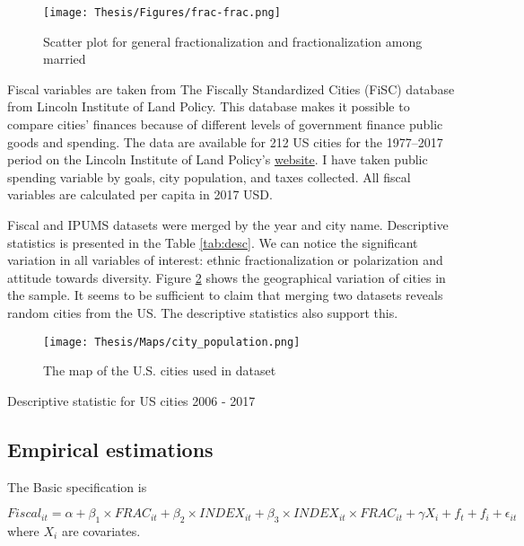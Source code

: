 \documentclass[12pt]{article}
\begin{document}
\begin{figure}[h!]
    \centering
    \texttt{[image: Thesis/Figures/frac-frac.png]}
    \caption{Scatter plot for general fractionalization and fractionalization among married}
    \label{fig:frac-frac}
\end{figure}

Fiscal variables are taken from The Fiscally Standardized Cities (FiSC) database from Lincoln Institute of Land Policy. This database makes it possible to compare cities' finances because of different levels of government finance public goods and spending. The data are available for 212 US cities for the 1977–2017 period on the Lincoln Institute of Land Policy's \hyperlink{https://www.lincolninst.edu/research-data/data-toolkits/fiscally-standardized-cities}{website}. I have taken public spending variable by goals, city population, and taxes collected. All fiscal variables are calculated per capita in 2017 USD.

Fiscal and IPUMS datasets were merged by the year and city name. Descriptive statistics is presented in the Table \ref{tab:desc}. We can notice the significant variation in all variables of interest: ethnic fractionalization or polarization and attitude towards diversity. Figure \ref{fig:map} shows the geographical variation of cities in the sample. It seems to be sufficient to claim that merging two datasets reveals random cities from the US. The descriptive statistics also support this. 

\begin{figure}[h!]
    \centering
    \texttt{[image: Thesis/Maps/city\_population.png]}
    \caption{The map of the U.S. cities used in dataset}
    \label{fig:map}
\end{figure}

\begin{table}[h!]
    \centering
    
    \caption{Descriptive statistic for US cities 2006 - 2017}
    \label{tab:desc}
\end{table}

\subsection{Empirical estimations}

The Basic specification is 

\begin{equation}
\label{eq: basic}
    Fiscal_{it} = \alpha + \beta_1 \times FRAC_{it} + \beta_2 \times INDEX_{it} + \beta_3 \times INDEX_{it} \times FRAC_{it} + \gamma X_i + f_t + f_i + \epsilon_{it}
\end{equation}
where $X_i$ are covariates.
\end{document}
